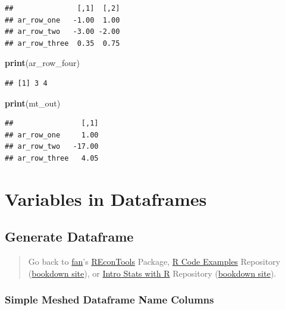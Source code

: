 \documentclass[
]{book}
\newenvironment{Shaded}{\begin{snugshade}}{\end{snugshade}}
\newcommand{\KeywordTok}[1]{\textcolor[rgb]{0.13,0.29,0.53}{\textbf{#1}}}
\newcommand{\NormalTok}[1]{#1}
\begin{document}
\begin{verbatim}
##               [,1]  [,2]
## ar_row_one   -1.00  1.00
## ar_row_two   -3.00 -2.00
## ar_row_three  0.35  0.75
\end{verbatim}

\begin{Shaded}
\begin{Highlighting}[]
\KeywordTok{print}\NormalTok{(ar\_row\_four)}
\end{Highlighting}
\end{Shaded}

\begin{verbatim}
## [1] 3 4
\end{verbatim}

\begin{Shaded}
\begin{Highlighting}[]
\KeywordTok{print}\NormalTok{(mt\_out)}
\end{Highlighting}
\end{Shaded}

\begin{verbatim}
##                [,1]
## ar_row_one     1.00
## ar_row_two   -17.00
## ar_row_three   4.05
\end{verbatim}

\hypertarget{variables-in-dataframes}{%
\section{Variables in Dataframes}\label{variables-in-dataframes}}

\hypertarget{generate-dataframe}{%
\subsection{Generate Dataframe}\label{generate-dataframe}}

\begin{quote}
Go back to \href{http://fanwangecon.github.io/}{fan}'s \href{https://fanwangecon.github.io/REconTools/}{REconTools} Package, \href{https://fanwangecon.github.io/R4Econ/}{R Code Examples} Repository (\href{https://fanwangecon.github.io/R4Econ/bookdown}{bookdown site}), or \href{https://fanwangecon.github.io/Stat4Econ/}{Intro Stats with R} Repository (\href{https://fanwangecon.github.io/Stat4Econ/bookdown}{bookdown site}).
\end{quote}

\hypertarget{simple-meshed-dataframe-name-columns}{%
\subsubsection{Simple Meshed Dataframe Name Columns}\label{simple-meshed-dataframe-name-columns}}
\end{document}
